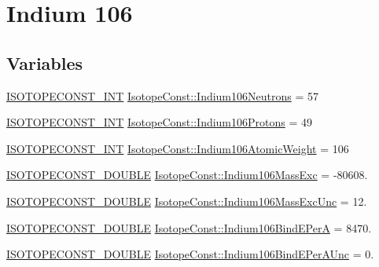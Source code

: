 \hypertarget{group___isotope_const-_indium-_in106}{}\section{Indium 106}
\label{group___isotope_const-_indium-_in106}
\subsection*{Variables}
\begin{DoxyCompactItemize}
\item 
\mbox{\hyperlink{group___isotope_const-_macros_ga5f18360b3e99483a35c32d789e62621c}{I\+S\+O\+T\+O\+P\+E\+C\+O\+N\+S\+T\+\_\+\+I\+NT}} \mbox{\hyperlink{group___isotope_const-_indium-_in106_gac5c294af79775bce95463f60a0b04fb5}{Isotope\+Const\+::\+Indium106\+Neutrons}} = 57
\item 
\mbox{\hyperlink{group___isotope_const-_macros_ga5f18360b3e99483a35c32d789e62621c}{I\+S\+O\+T\+O\+P\+E\+C\+O\+N\+S\+T\+\_\+\+I\+NT}} \mbox{\hyperlink{group___isotope_const-_indium-_in106_gaacbb6675e826f3ef2fc6a0193fe88323}{Isotope\+Const\+::\+Indium106\+Protons}} = 49
\item 
\mbox{\hyperlink{group___isotope_const-_macros_ga5f18360b3e99483a35c32d789e62621c}{I\+S\+O\+T\+O\+P\+E\+C\+O\+N\+S\+T\+\_\+\+I\+NT}} \mbox{\hyperlink{group___isotope_const-_indium-_in106_ga834c792a92e2e17c089a036ed8269161}{Isotope\+Const\+::\+Indium106\+Atomic\+Weight}} = 106
\item 
\mbox{\hyperlink{group___isotope_const-_macros_ga8f45a7272ce02c0b4c65c44636ed719a}{I\+S\+O\+T\+O\+P\+E\+C\+O\+N\+S\+T\+\_\+\+D\+O\+U\+B\+LE}} \mbox{\hyperlink{group___isotope_const-_indium-_in106_gab83465f7fad4021da8d06c48fea52d43}{Isotope\+Const\+::\+Indium106\+Mass\+Exc}} = -\/80608.
\item 
\mbox{\hyperlink{group___isotope_const-_macros_ga8f45a7272ce02c0b4c65c44636ed719a}{I\+S\+O\+T\+O\+P\+E\+C\+O\+N\+S\+T\+\_\+\+D\+O\+U\+B\+LE}} \mbox{\hyperlink{group___isotope_const-_indium-_in106_gafd0e52ada5ad3503f377528aab8b0d94}{Isotope\+Const\+::\+Indium106\+Mass\+Exc\+Unc}} = 12.
\item 
\mbox{\hyperlink{group___isotope_const-_macros_ga8f45a7272ce02c0b4c65c44636ed719a}{I\+S\+O\+T\+O\+P\+E\+C\+O\+N\+S\+T\+\_\+\+D\+O\+U\+B\+LE}} \mbox{\hyperlink{group___isotope_const-_indium-_in106_gaa3b8308a33693cefeedb85d9369de260}{Isotope\+Const\+::\+Indium106\+Bind\+E\+PerA}} = 8470.
\item 
\mbox{\hyperlink{group___isotope_const-_macros_ga8f45a7272ce02c0b4c65c44636ed719a}{I\+S\+O\+T\+O\+P\+E\+C\+O\+N\+S\+T\+\_\+\+D\+O\+U\+B\+LE}} \mbox{\hyperlink{group___isotope_const-_indium-_in106_gadadf2e3424864349597e551d8e00eb39}{Isotope\+Const\+::\+Indium106\+Bind\+E\+Per\+A\+Unc}} = 0.

\end{DoxyCompactItemize}
